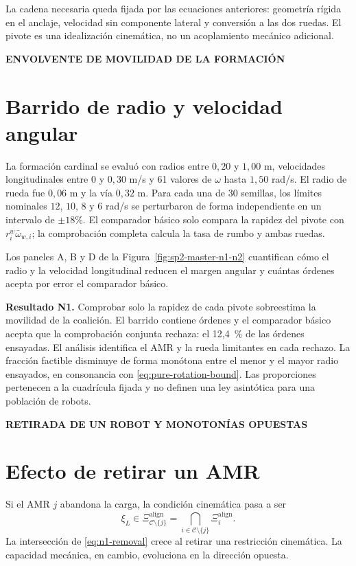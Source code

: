 \documentclass[12pt,a4paper]{article}
\newcommand{\leveltag}[1]{%
  \Needspace{5.5\baselineskip}%
  \noindent\colorbox{VIUDark}{%
    \parbox{\dimexpr\textwidth-2\fboxsep\relax}{%
      \color{white}\sffamily\bfseries\small #1%
    }%
  }\par\smallskip
}
\begin{document}
La cadena necesaria queda fijada por las ecuaciones anteriores: geometría rígida
en el anclaje, velocidad sin componente lateral y conversión a las dos ruedas.
El pivote es una idealización cinemática, no un acoplamiento mecánico adicional.


\leveltag{ENVOLVENTE DE MOVILIDAD DE LA FORMACIÓN}
\section*{Barrido de radio y velocidad angular}

La formación cardinal se evaluó con radios entre $0{,}20$ y $1{,}00$ m,
velocidades longitudinales entre $0$ y $0{,}30$ m/s y 61 valores de $\omega$
hasta $1{,}50$ rad/s. El radio de rueda fue $0{,}06$ m y la vía $0{,}32$ m. Para
cada una de 30 semillas, los límites nominales $12$, $10$, $8$ y $6$ rad/s se
perturbaron de forma independiente en un intervalo de $\pm18\%$. El comparador
básico solo compara la rapidez del pivote con
$r_i^w\bar\omega_{w,i}$; la comprobación
completa calcula la tasa de rumbo y ambas ruedas.

Los paneles A, B y D de la Figura~\ref{fig:sp2-master-n1-n2} cuantifican cómo el
radio y la velocidad longitudinal reducen el margen angular y cuántas órdenes
acepta por error el comparador básico.

\textbf{Resultado N1.} Comprobar solo la rapidez de cada pivote sobreestima la
movilidad de la coalición. El barrido contiene \SPTwoReadyNOneRows{} órdenes y
el comparador básico acepta
\SPTwoReadyNOneFalse{} que la comprobación conjunta rechaza: el 12,4~\% de las
órdenes ensayadas. El análisis identifica el AMR y la rueda limitantes en cada
rechazo. La fracción factible disminuye de forma monótona entre el menor y el
mayor radio ensayados, en consonancia con \eqref{eq:pure-rotation-bound}. Las
proporciones pertenecen a la cuadrícula fijada y no definen una ley asintótica
para una población de robots.

\leveltag{RETIRADA DE UN ROBOT Y MONOTONÍAS OPUESTAS}
\section*{Efecto de retirar un AMR}

Si el AMR $j$ abandona la carga, la condición cinemática pasa a ser
\begin{equation}
\xi_L\in\Xi_{\mathcal C\setminus\{j\}}^{\mathrm{align}}
=\bigcap_{i\in\mathcal C\setminus\{j\}}\Xi_i^{\mathrm{align}}.
\label{eq:n1-removal}
\end{equation}
La intersección de \eqref{eq:n1-removal} crece al retirar una restricción cinemática. La capacidad
mecánica, en cambio, evoluciona en la dirección opuesta.
\end{document}
